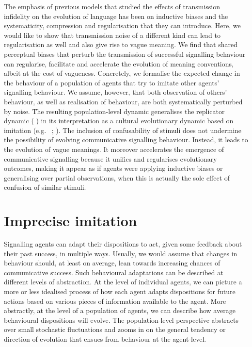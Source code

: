 \documentclass[11pt,english]{article}
\numberwithin{equation}{section}
\newcommand{\citealtbjps}[1]{\citeauthor{#1} \citeyear{#1}}
\newcommand{\citepbjps}[1]{(\citeauthor{#1} \citeyear{#1})}
\begin{document}
The emphasis of previous models that studied the effects of transmission infidelity on the
evolution of language has been on inductive biases and the systematicity, compression and
regularisation that they can introduce. Here, we would like to show that transmission noise of
a different kind can lead to regularisation as well and also give rise to vague meaning. We
find that shared perceptual biases that perturb the transmission of successful signalling
behaviour can regularise, facilitate and accelerate the evolution of meaning conventions, albeit
at the cost of vagueness. Concretely, we formalise the expected change in the behaviour of a
population of agents that try to imitate other agents' signalling behaviour. We assume, however,
that both observation of others' behaviour, as well as realisation of behaviour, are both
systematically perturbed by noise. The resulting population-level dynamic generalises the
replicator dynamic \citepbjps{TaylorJonker1978:Evolutionary-St} in its interpretation as a cultural
evolutionary dynamic based on imitation
(e.g.~\citealtbjps{Helbing1996:A-Stochastic-Be}; \citealtbjps{Schlag1998:Why-Imitate-and}). The inclusion of
confusability of stimuli does not undermine the possibility of evolving communicative signalling
behaviour. Instead, it leads to the evolution of vague meanings. It moreover accelerates the
emergence of communicative signalling because it unifies and regularises evolutionary outcomes,
making it appear as if agents were applying inductive biases or generalising over partial
observations, when this is actually the sole effect of confusion of similar stimuli.




\section{Imprecise imitation}
\label{sec:repl-diff-dynam}

Signalling agents can adapt their dispositions to act, given some feedback about their past
success, in multiple ways. Usually, we would assume that changes in behaviour should, at least
on average, lean towards increasing chances of communicative success. Such behavioural
adaptations can be described at different levels of abstraction. At the level of individual
agents, we can picture a more or less idealised process of how each agent adapts dispositions
for future actions based on various pieces of information available to the agent. More
abstractly, at the level of a population of agents, we can describe how average behavioural
dispositions will evolve. The population-level perspective abstracts over small stochastic
fluctuations and zooms in on the general tendency or direction of evolution that ensues from
behaviour at the agent-level.
\end{document}
